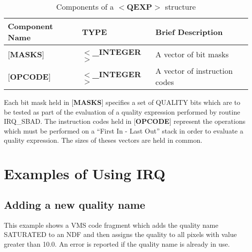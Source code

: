 \begin{table}[htb]
\centering
\caption{Components of a $<${\bf QEXP}$>$ structure}
\label{TAB:QEXP}
\begin{tabular}{|l|l|l|}
\hline
Component Name & TYPE & Brief Description \\ \hline
{[}{\bf MASKS}{]} & $<${\bf \_INTEGER}$>$ & A vector of bit masks\\
{[}{\bf OPCODE}{]} & $<${\bf \_INTEGER}$>$ & A vector of instruction codes\\
\hline
\end{tabular}
\end{table}

Each bit mask held in {[}{\bf MASKS}{]} specifies a set of QUALITY bits which
are to be tested as part of the evaluation of a quality expression performed by
routine IRQ\_SBAD. The instruction codes held in {[}{\bf OPCODE}{]} represent
the operations which must be performed on a ``First In - Last Out'' stack in
order to evaluate a quality expression. The sizes of theses vectors are held in
common. 

\section {Examples of Using IRQ}
\newcommand{\numcir}[1]{\mbox{\hspace{3ex}$\bigcirc$\hspace{-1.7ex}{\small #1}}}
\label{APP:EXAMS}
\subsection {Adding a new quality name}
This example shows a VMS code fragment which adds the quality name SATURATED to an
NDF and then assigns the quality to all pixels with value greater than 10.0.
An error is reported if the quality name is already in use.

